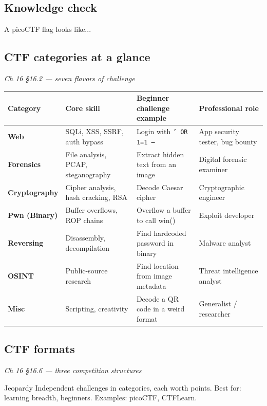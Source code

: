 \documentclass[12pt,openany]{book}
\begin{document}
\subsection*{Knowledge check}

A picoCTF flag looks like...

\medskip

\subsection*{CTF categories at a glance}
{\small\itshape\color{gray}Ch 16 §16.2 --- seven flavors of challenge}

\begin{center}\small\begin{tabular}{p{3.2cm}p{3.2cm}p{3.2cm}p{3.2cm}}\toprule
\textbf{Category} & \textbf{Core skill} & \textbf{Beginner challenge example} & \textbf{Professional role} \\ \midrule
\textbf{Web} & SQLi, XSS, SSRF, auth bypass & Login with \texttt{' OR 1=1 --} & App security tester, bug bounty \\
\textbf{Forensics} & File analysis, PCAP, steganography & Extract hidden text from an image & Digital forensic examiner \\
\textbf{Cryptography} & Cipher analysis, hash cracking, RSA & Decode Caesar cipher & Cryptographic engineer \\
\textbf{Pwn (Binary)} & Buffer overflows, ROP chains & Overflow a buffer to call win() & Exploit developer \\
\textbf{Reversing} & Disassembly, decompilation & Find hardcoded password in binary & Malware analyst \\
\textbf{OSINT} & Public-source research & Find location from image metadata & Threat intelligence analyst \\
\textbf{Misc} & Scripting, creativity & Decode a QR code in a weird format & Generalist / researcher \\
\bottomrule\end{tabular}\end{center}

\medskip

\subsection*{CTF formats}
{\small\itshape\color{gray}Ch 16 §16.6 --- three competition structures}

Jeopardy
Independent challenges in categories, each worth points.
Best for: learning breadth, beginners.
Examples: picoCTF, CTFLearn.
\end{document}
